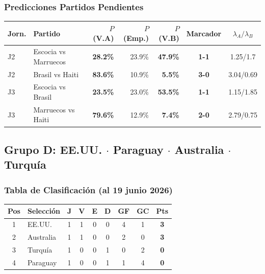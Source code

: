 \documentclass[11pt,a4paper]{article}
\newcommand{\prob}[1]{\textbf{#1\%}}
\begin{document}
\subsubsection*{Predicciones Partidos Pendientes}


\begin{center}
\begin{tabular}{@{}llrrrcc@{}}
\toprule
\textbf{Jorn.} & \textbf{Partido} & \textbf{$P$(V.A)} & \textbf{$P$(Emp.)} & \textbf{$P$(V.B)} & \textbf{Marcador} & \textbf{$\lambda_A/\lambda_B$} \\
\midrule
  J2 & Escocia vs Marruecos & \cellcolor{red!15}\prob{28.2} & 23.9\% & \cellcolor{yellow!30}\prob{47.9} & \textbf{1-1} & 1.25/1.7 \\
  J2 & Brasil vs Haiti & \cellcolor{green!20}\prob{83.6} & 10.9\% & \cellcolor{red!15}\prob{5.5} & \textbf{3-0} & 3.04/0.69 \\
  J3 & Escocia vs Brasil & \cellcolor{red!15}\prob{23.5} & 23.0\% & \cellcolor{yellow!30}\prob{53.5} & \textbf{1-1} & 1.15/1.85 \\
  J3 & Marruecos vs Haiti & \cellcolor{green!20}\prob{79.6} & 12.9\% & \cellcolor{red!15}\prob{7.4} & \textbf{2-0} & 2.79/0.75 \\
\bottomrule
\end{tabular}
\end{center}


\subsection{Grupo D: EE.UU. $\cdot$ Paraguay $\cdot$ Australia $\cdot$ Turquía}

\subsubsection*{Tabla de Clasificación (al 19 junio 2026)}


\begin{center}
\begin{tabular}{@{}clccccccc@{}}
\toprule
\textbf{Pos} & \textbf{Selección} & \textbf{J} & \textbf{V} & \textbf{E} & \textbf{D} & \textbf{GF} & \textbf{GC} & \textbf{Pts} \\
\midrule
  \cellcolor{green!25}1 & \cellcolor{green!25}EE.UU. & 1 & 1 & 0 & 0 & 4 & 1 & \textbf{3} \\
  \cellcolor{green!25}2 & \cellcolor{green!25}Australia & 1 & 1 & 0 & 0 & 2 & 0 & \textbf{3} \\
  \cellcolor{yellow!20}3 & \cellcolor{yellow!20}Turquía & 1 & 0 & 0 & 1 & 0 & 2 & \textbf{0} \\
  4 & Paraguay & 1 & 0 & 0 & 1 & 1 & 4 & \textbf{0} \\
\bottomrule
\end{tabular}
\end{center}
\end{document}
